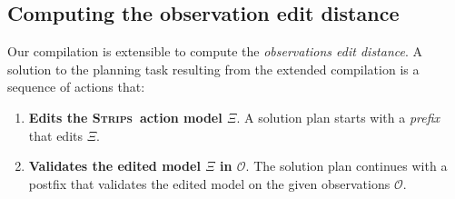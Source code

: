 \documentclass{article}
\newcommand{\strips}{\textsc{Strips}}     %
\begin{document}


\subsection{Computing the observation edit distance}
Our compilation is extensible to compute the {\em observations edit distance}. A solution to the planning task resulting from the extended compilation is a sequence of actions that:
\begin{enumerate}
\item {\bf Edits the \strips\ action model $\Xi$}. A solution plan starts with a {\em prefix} that edits $\Xi$.
\item {\bf Validates the edited model $\Xi$ in $\mathcal{O}$}. The solution plan continues with a postfix that validates the edited model on the given observations $\mathcal{O}$.
\end{enumerate}
\end{document}
